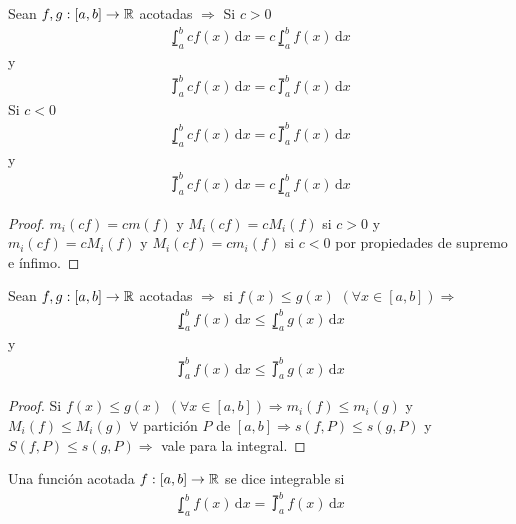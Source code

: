 \begin{prop}
  Sean $f, g: [a, b] \to \mathbb{R}$ acotadas $\Rightarrow$
  Si $c > 0$ \begin{align*}
    \lowint_a^b c f(x)\,\mathrm{d}x = c \lowint_a^b f(x)\,\mathrm{d}x
  \end{align*} y \begin{align*}
    \upint_a^b c f(x)\, \mathrm{d}x = c \upint_a^b f(x)\, \mathrm{d}x
  \end{align*}
  Si $c < 0$ \begin{align*}
    \lowint_a^b c f(x)\,\mathrm{d}x = c \upint_a^b f(x)\,\mathrm{d}x
  \end{align*} y \begin{align*}
    \upint_a^b c f(x)\,\mathrm{d}x = c \lowint_a^b f(x)\,\mathrm{d}x
  \end{align*}
  \begin{proof}
    $m_i(c f) = c m(f)$ y $M_i(c f) = c M_i(f)$ si $c > 0$ y $m_i(c f) = c M_i(f)$ y $M_i(c f) = c m_i(f)$ si $c < 0$ por propiedades de supremo e ínfimo.
  \end{proof}
\end{prop}

\begin{prop}
  Sean $f, g: [a, b] \to \mathbb{R}$ acotadas $\Rightarrow$ si $f(x) \leq g(x)$ $(\forall x \in [a, b]) \Rightarrow$ \begin{align*}
    \lowint_a^b f(x)\,\mathrm{d}x \leq \lowint_a^b g(x)\,\mathrm{d}x
  \end{align*} y \begin{align*}
    \upint_a^b f(x)\, \mathrm{d}x \leq \upint_a^b g(x)\, \mathrm{d}x
  \end{align*}
  \begin{proof}
    Si $f(x) \leq g(x)$ $(\forall x \in [a, b]) \Rightarrow m_i(f) \leq m_i(g)$ y $M_i(f) \leq M_i(g)$ $\forall$ partición $P$ de $[a, b] \Rightarrow s(f, P) \leq s(g, P)$ y $S(f, P) \leq s(g, P) \Rightarrow$ vale para la integral.
  \end{proof}
\end{prop}

\begin{definition}[Integrable]
  Una función acotada $f: [a, b] \to \mathbb{R}$ se dice integrable si \begin{align*}
    \lowint_a^b f(x) \, \mathrm{d}x = \upint_a^b f(x) \, \mathrm{d}x
  \end{align*}
\end{definition}

\clearpage

